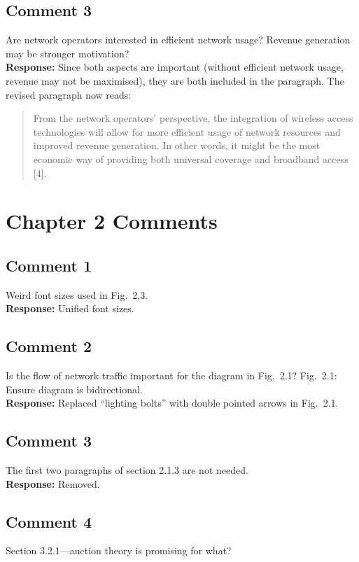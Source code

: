 \documentclass[10pt,a4paper,notitlepage]{article}
\numberwithin{equation}{section}
\begin{document}
\subsection{Comment 3}
Are network operators interested in efficient network usage? Revenue generation may be stronger motivation?\\[-2ex]

\textbf{Response:}
Since both aspects are important (without efficient network usage, revenue may not be maximised), they are both included in the paragraph. The revised paragraph now reads:
\begin{quote}
From the network operators' perspective, the integration of wireless access technologies will allow for more efficient usage of network resources and improved revenue generation. In other words, it might be the most economic way of providing both universal coverage and broadband access [4].
\end{quote}

\clearpage

\section{Chapter 2 Comments}
\subsection{Comment 1}
Weird font sizes used in Fig.~2.3.\\[-2ex]

\textbf{Response:}
Unified font sizes.

\subsection{Comment 2}
Is the flow of network traffic important for the diagram in Fig.~2.1? Fig.~2.1: Ensure diagram is bidirectional.\\[-2ex]

\textbf{Response:}
Replaced ``lighting bolts'' with double pointed arrows in Fig.~2.1.

\subsection{Comment 3}
The first two paragraphs of section 2.1.3 are not needed.\\[-2ex]

\textbf{Response:}
Removed.

\subsection{Comment 4}
Section 3.2.1---auction theory is promising for what?\\[-2ex]
\end{document}
